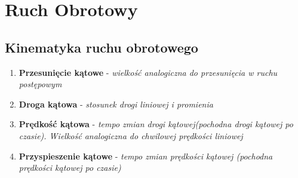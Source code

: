\documentclass[12pt,twoside,a4paper]{book}
\begin{document}
\chapter{Ruch Obrotowy}
\section{Kinematyka ruchu obrotowego}
\begin{enumerate}[label=(\alph*)]
\item\textbf{Przesunięcie kątowe} - \textit{wielkość analogiczna do przesunięcia w ruchu postępowym}
\item\textbf{Droga kątowa} - \textit{stosunek drogi liniowej i promienia}
\item\textbf{Prędkość kątowa} - \textit{tempo zmian drogi kątowej(pochodna drogi kątowej po czasie). Wielkość analogiczna do chwilowej prędkości liniowej}
\item\textbf{Przyspieszenie kątowe} - \textit{tempo zmian prędkości kątowej (pochodna prędkości kątowej po czasie)}
\end{enumerate}
\end{document}
